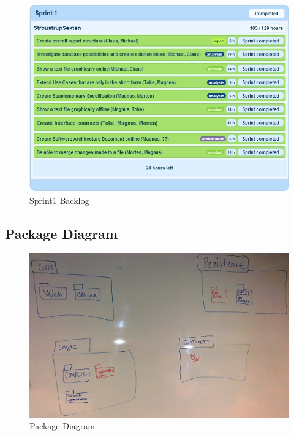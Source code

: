 \begin{figure}[H]
  \includegraphics[width=\textwidth,natwidth=678,natheight=486]{illustrations/sprintbacklog1.jpeg}
  \caption{Sprint1 Backlog}
  \label{sprint1backlog}
\end{figure}
\subsection{Package Diagram}
\begin{figure}[H]
  \includegraphics[width=\textwidth,natwidth=2631,natheight=1660]{illustrations/PackageDiagram.jpg}
  \caption{Package Diagram}
  \label{packagediagram}
\end{figure}
